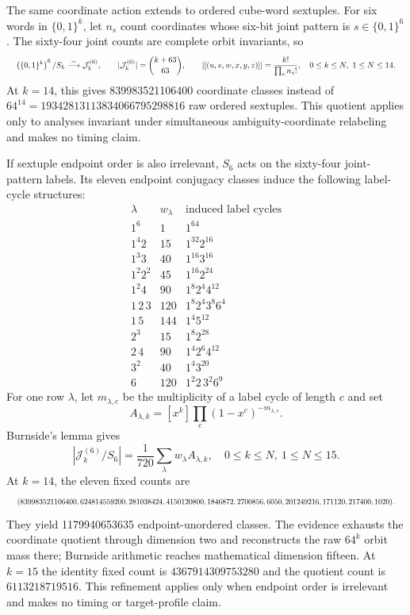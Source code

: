 \documentclass{article}
\newcommand{\fitmath}[1]{\resizebox{0.99\linewidth}{!}{$\displaystyle #1$}}
\begin{document}
The same coordinate action extends to ordered cube-word sextuples. For six
words in $\{0,1\}^k$, let $n_s$ count coordinates whose six-bit joint pattern
is $s\in\{0,1\}^6$. The sixty-four joint counts are complete orbit invariants,
so
\begin{equation}
  \fitmath{%
    \left(\{0,1\}^k\right)^6/S_k
      \overset{\sim}{\longrightarrow}\mathcal{J}^{(6)}_k,
    \qquad
    |\mathcal{J}^{(6)}_k|=\binom{k+63}{63},
    \qquad
    |[(u,v,w,x,y,z)]|=\frac{k!}{\prod_s n_s!},
    \quad 0\leq k\leq N,\ 1\leq N\leq14.
  }
  \label{eq:optimization-crazy-preimage-cube-ordered-sextuple-quotient}
\end{equation}
At $k=14$, this gives 839983521106400 coordinate classes instead of
$64^{14}=19342813113834066795298816$ raw ordered sextuples. This quotient
applies only to analyses invariant under simultaneous ambiguity-coordinate
relabeling and makes no timing claim.

If sextuple endpoint order is also irrelevant, $S_6$ acts on the sixty-four
joint-pattern labels. Its eleven endpoint conjugacy classes induce the following
label-cycle structures:
\[
\begin{array}{c|r|c}
\lambda&w_\lambda&\text{induced label cycles}\\ \hline
1^6&1&1^{64}\\
1^4 2&15&1^{32}2^{16}\\
1^3 3&40&1^{16}3^{16}\\
1^2 2^2&45&1^{16}2^{24}\\
1^2 4&90&1^8 2^4 4^{12}\\
1\,2\,3&120&1^8 2^4 3^8 6^4\\
1\,5&144&1^4 5^{12}\\
2^3&15&1^8 2^{28}\\
2\,4&90&1^4 2^6 4^{12}\\
3^2&40&1^4 3^{20}\\
6&120&1^2 2\,3^2 6^9
\end{array}
\]
For one row $\lambda$, let $m_{\lambda,c}$ be the multiplicity of a label cycle
of length $c$ and set
\[
  A_{\lambda,k}=[x^k]\prod_c(1-x^c)^{-m_{\lambda,c}}.
\]
Burnside's lemma gives
\begin{equation}
  \left|\mathcal{J}^{(6)}_k/S_6\right|
    =\frac{1}{720}\sum_\lambda w_\lambda A_{\lambda,k},
  \quad 0\leq k\leq N,\ 1\leq N\leq15.
  \label{eq:optimization-crazy-preimage-cube-unordered-sextuple-quotient}
\end{equation}
At $k=14$, the eleven fixed counts are
\begin{equation*}
  \fitmath{%
    (839983521106400,624814559200,281038424,4150120800,1846872,2700856,
    6050,201249216,171120,217400,1020).
  }
\end{equation*}
They yield 1179940653635 endpoint-unordered classes. The evidence exhausts the
coordinate quotient through dimension two and reconstructs the raw $64^k$ orbit
mass there; Burnside arithmetic reaches mathematical dimension fifteen. At
$k=15$ the
identity fixed count is $4367914309753280$ and the quotient count is
$6113218719516$. This refinement applies only when endpoint order is irrelevant
and makes no timing or target-profile claim.
\end{document}

